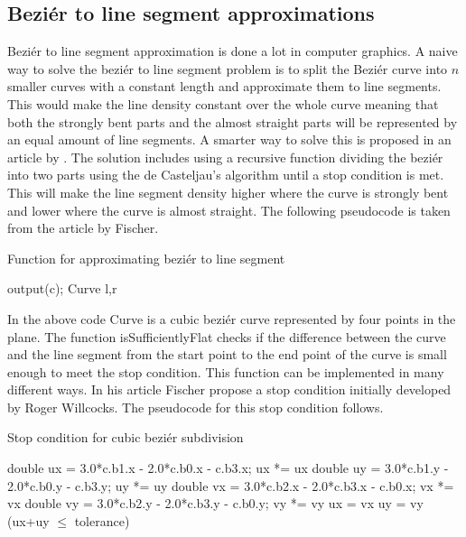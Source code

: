 \subsection{Beziér to line segment approximations}
Beziér to line segment approximation is done a lot in computer graphics. A naive way to solve the beziér to line segment problem is to split the Beziér curve into $n$ smaller curves with a constant length and approximate them to line segments. This would make the line density constant over the whole curve meaning that both the strongly bent parts and the almost straight parts will be represented by an equal amount of line segments. A smarter way to solve this is proposed in an article by \citet{fischer2000}. The solution includes using a recursive function dividing the beziér into two parts using the de Casteljau's algorithm until a stop condition is met. This will make the line segment density higher where the curve is strongly bent and lower where the curve is almost straight. The following pseudocode is taken from the article by Fischer.
\begin{algorithm}[H]
\caption{Function for approximating beziér to line segment}
\begin{algorithmic}
  \State output(c);
\Else
	\State Curve l,r\;
	\State{}\;
	\State{}\;
	\State{}\;
\EndIf
\EndProcedure
\end{algorithmic}
\end{algorithm}
In the above code Curve is a cubic beziér curve represented by four points in the plane. The function isSufficientlyFlat checks if the difference between the curve and the line segment from the start point to the end point of the curve is small enough to meet the stop condition. This function can be implemented in many different ways. In his article Fischer propose a stop condition initially developed by Roger Willcocks. The pseudocode for this stop condition follows.

\begin{algorithm}[H]
\caption{Stop condition for cubic beziér subdivision}
\begin{algorithmic}
	\State double ux = 3.0*c.b1.x - 2.0*c.b0.x - c.b3.x; ux *= ux\;
	\State double uy = 3.0*c.b1.y - 2.0*c.b0.y - c.b3.y; uy *= uy\;
	\State double vx = 3.0*c.b2.x - 2.0*c.b3.x - c.b0.x; vx *= vx\;
	\State double vy = 3.0*c.b2.y - 2.0*c.b3.y - c.b0.y; vy *= vy\;
	\State ux = vx\; 	
	\EndIf
		\State uy = vy\; 
	\EndIf
	\State\Return (ux+uy $\leq$ tolerance)\;
\EndFunction
\end{algorithmic}
\end{algorithm}

